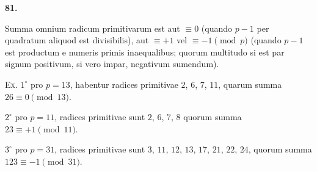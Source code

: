 \documentclass[12pt,a4paper]{article}
\theoremstyle{plain}
\theoremstyle{definition}
\theoremstyle{remark}
\begin{document}
\setcounter{satz}{81}
\addtocounter{satz}{-1}
\textbf{81.}

Summa omnium radicum primitivarum est aut $\equiv 0$ (quando $p-1$ per quadratum aliquod est divisibilis), aut $\equiv +1$ vel $\equiv -1 \pmod{p}$ (quando $p-1$ est productum e numeris primis inaequalibus; quorum multitudo si est par signum positivum, si vero impar, negativum sumendum).

\textsc{Ex.} $1^\circ$ pro $p=13$, habentur radices primitivae $2$, $6$, $7$, $11$, quarum summa $26 \equiv 0 \pmod{13}$.

$2^\circ$ pro $p=11$, radices primitivae sunt $2$, $6$, $7$, $8$ quorum summa $23 \equiv +1 \pmod{11}$.

$3^\circ$ pro $p=31$, radices primitivae sunt $3$, $11$, $12$, $13$, $17$, $21$, $22$, $24$, quorum summa $123 \equiv -1 \pmod{31}$.
\end{document}
